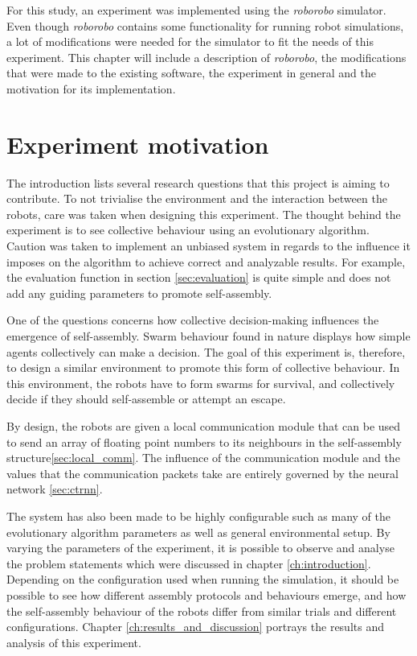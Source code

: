 For this study, an experiment was implemented using the \emph{roborobo} simulator\cite{bredeche_roborobo!_2013}.
Even though \emph{roborobo} contains some functionality for running robot simulations, a lot of modifications were needed for the simulator to fit the needs of this experiment.
This chapter will include a description of \emph{roborobo}, the modifications that were made to the existing software, the experiment in general and the motivation for its implementation.

\section{Experiment motivation}
The introduction lists several research questions that this project is aiming to contribute.
To not trivialise the environment and the interaction between the robots, care was taken when designing this experiment.
The thought behind the experiment is to see collective behaviour using an evolutionary algorithm.
Caution was taken to implement an unbiased system in regards to the influence it imposes on the algorithm to achieve correct and analyzable results.  
For example, the evaluation function in section \ref{sec:evaluation} is quite simple and does not add any guiding parameters to promote self-assembly.

One of the questions concerns how collective decision-making influences the emergence of self-assembly.
Swarm behaviour found in nature displays how simple agents collectively can make a decision.
The goal of this experiment is, therefore, to design a similar environment to promote this form of collective behaviour.
In this environment, the robots have to form swarms for survival, and collectively decide if they should self-assemble or attempt an escape.

By design, the robots are given a local communication module that can be used to send an array of floating point numbers to its neighbours in the self-assembly structure\ref{sec:local_comm}.
The influence of the communication module and the values that the communication packets take are entirely governed by the neural network \ref{sec:ctrnn}.

The system has also been made to be highly configurable such as many of the evolutionary algorithm parameters as well as general environmental setup. 
By varying the parameters of the experiment, it is possible to observe and analyse the problem statements which were discussed in chapter \ref{ch:introduction}.
Depending on the configuration used when running the simulation, it should be possible to see how different assembly protocols and behaviours emerge, and how the self-assembly behaviour of the robots differ from similar trials and different configurations.
Chapter \ref{ch:results_and_discussion} portrays the results and analysis of this experiment.


